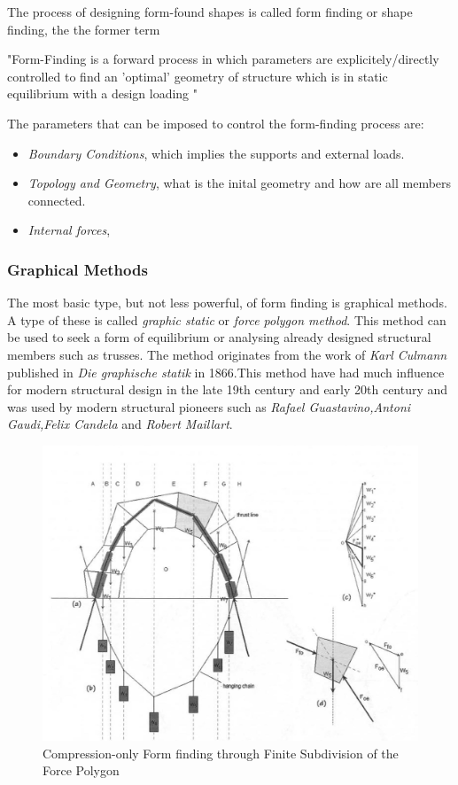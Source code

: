 The process of designing form-found shapes is called form finding or shape finding, the the former term

"Form-Finding is a forward process in which parameters are explicitely/directly controlled to find an 'optimal' geometry of structure which is in static equilibrium with a design loading "

The parameters that can be imposed to control the form-finding process are:

\begin{itemize}
\item \textit{Boundary Conditions}, which implies the supports and external loads.
\item \textit{Topology and Geometry}, what is the inital geometry and how are all members connected.
\item \textit{Internal forces}, 
\end{itemize}


\subsubsection{Graphical Methods}

The most basic type, but not less powerful, of form finding is graphical methods. A type of these is called \textit{graphic static} or \textit{force polygon method}. This method can be used to seek a form of equilibrium or analysing already designed structural members such as trusses. The method originates from the work of \textit{Karl Culmann} published in \textit{Die graphische statik} in 1866.This method have had much influence for modern structural design in the late 19th century and early 20th century and was used by modern structural pioneers such as \textit{Rafael Guastavino,Antoni Gaudi,Felix Candela} and \textit{Robert Maillart}. 

\begin{figure}[H]
\centering
\includegraphics[width=0.6\linewidth ]{figure/Introduction/GraphStat4.JPG}
\caption{Compression-only Form finding through Finite Subdivision of the
Force Polygon }
\end{figure}

